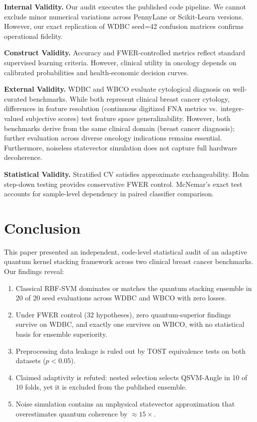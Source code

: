\documentclass[journal,twocolumn]{IEEEtran}
\begin{document}
\textbf{Internal Validity.} Our audit executes the published code pipeline. We cannot exclude minor numerical variations across PennyLane \cite{bergholm2018pennylane} or Scikit-Learn \cite{pedregosa2011sklearn} versions. However, our exact replication of WDBC seed=42 confusion matrices confirms operational fidelity.

\textbf{Construct Validity.} Accuracy and FWER-controlled metrics reflect standard supervised learning criteria. However, clinical utility in oncology depends on calibrated probabilities and health-economic decision curves.

\textbf{External Validity.} WDBC and WBCO evaluate cytological diagnosis on well-curated benchmarks. While both represent clinical breast cancer cytology, differences in feature resolution (continuous digitized FNA metrics vs.\ integer-valued subjective scores) test feature space generalizability. However, both benchmarks derive from the same clinical domain (breast cancer diagnosis); further evaluation across diverse oncology indications remains essential. Furthermore, noiseless statevector simulation does not capture full hardware decoherence.

\textbf{Statistical Validity.} Stratified CV satisfies approximate exchangeability. Holm step-down testing provides conservative FWER control. McNemar's exact test accounts for sample-level dependency in paired classifier comparison.

\section{Conclusion}
\label{sec:conclusion}

This paper presented an independent, code-level statistical audit of an adaptive quantum kernel stacking framework across two clinical breast cancer benchmarks. Our findings reveal:
\begin{enumerate}
    \item Classical RBF-SVM dominates or matches the quantum stacking ensemble in 20 of 20 seed evaluations across WDBC and WBCO with zero losses.
    \item Under FWER control (32 hypotheses), zero quantum-superior findings survive on WDBC, and exactly one survives on WBCO, with no statistical basis for ensemble superiority.
    \item Preprocessing data leakage is ruled out by TOST equivalence tests on both datasets ($p < 0.05$).
    \item Claimed adaptivity is refuted: nested selection selects QSVM-Angle in 10 of 10 folds, yet it is excluded from the published ensemble.
    \item Noise simulation contains an unphysical statevector approximation that overestimates quantum coherence by $\approx 15\times$.
\end{enumerate}
\end{document}
